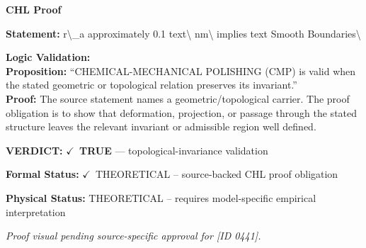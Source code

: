 \vspace{0.45em}
\noindent\textbf{CHL Proof}\par
\textbf{Statement:} r\textbackslash{}\_a approximately 0.1 text\textbackslash{} nm\textbackslash{} implies text Smooth Boundaries\textbackslash{}

\textbf{Logic Validation:}\\
\textbf{Proposition:} ``CHEMICAL-MECHANICAL POLISHING (CMP) is valid when the stated geometric or topological
relation preserves its invariant.''\\
\textbf{Proof:} The source statement names a geometric/topological carrier. The proof obligation is to
show that deformation, projection, or passage through the stated structure leaves the
relevant invariant or admissible region well defined.

\textbf{VERDICT:} \ensuremath{\checkmark}\ \textbf{TRUE} --- topological-invariance validation

\textbf{Formal Status:} \ensuremath{\checkmark}\ THEORETICAL -- source-backed CHL proof obligation

\textbf{Physical Status:} THEORETICAL -- requires model-specific empirical interpretation
\par\vspace{0.45em}
\par
\vfill
\begingroup\footnotesize\itshape
Proof visual pending source-specific approval for [ID 0441].
\par\endgroup
\vfill
\endgroup
\endgroup
